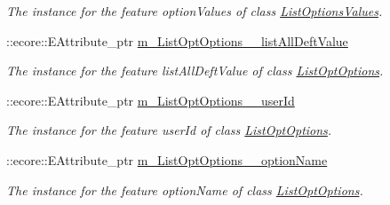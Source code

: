 \begin{DoxyCompactItemize}
\begin{DoxyCompactList}\small\item\em The instance for the feature optionValues of class \hyperlink{classUMS__Data_1_1ListOptionsValues}{ListOptionsValues}. \item\end{DoxyCompactList}\item 
\hypertarget{classUMS__Data_1_1UMS__DataPackage_ae56e34f1e364e7c677b361d725973922}{
::ecore::EAttribute\_\-ptr \hyperlink{classUMS__Data_1_1UMS__DataPackage_ae56e34f1e364e7c677b361d725973922}{m\_\-ListOptOptions\_\-\_\-listAllDeftValue}}
\label{classUMS__Data_1_1UMS__DataPackage_ae56e34f1e364e7c677b361d725973922}

\begin{DoxyCompactList}\small\item\em The instance for the feature listAllDeftValue of class \hyperlink{classUMS__Data_1_1ListOptOptions}{ListOptOptions}. \item\end{DoxyCompactList}\item 
\hypertarget{classUMS__Data_1_1UMS__DataPackage_a53609806861daaa12fe55a0678646621}{
::ecore::EAttribute\_\-ptr \hyperlink{classUMS__Data_1_1UMS__DataPackage_a53609806861daaa12fe55a0678646621}{m\_\-ListOptOptions\_\-\_\-userId}}
\label{classUMS__Data_1_1UMS__DataPackage_a53609806861daaa12fe55a0678646621}

\begin{DoxyCompactList}\small\item\em The instance for the feature userId of class \hyperlink{classUMS__Data_1_1ListOptOptions}{ListOptOptions}. \item\end{DoxyCompactList}\item 
\hypertarget{classUMS__Data_1_1UMS__DataPackage_a362114a831aeeb8ae47beecb5aede650}{
::ecore::EAttribute\_\-ptr \hyperlink{classUMS__Data_1_1UMS__DataPackage_a362114a831aeeb8ae47beecb5aede650}{m\_\-ListOptOptions\_\-\_\-optionName}}
\label{classUMS__Data_1_1UMS__DataPackage_a362114a831aeeb8ae47beecb5aede650}

\begin{DoxyCompactList}\small\item\em The instance for the feature optionName of class \hyperlink{classUMS__Data_1_1ListOptOptions}{ListOptOptions}. \item\end{DoxyCompactList}\end{DoxyCompactItemize}
